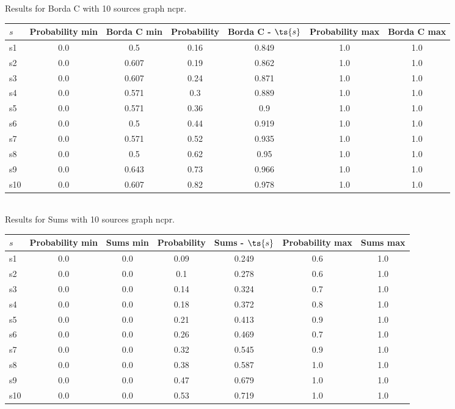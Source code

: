 \documentclass{article}
\begin{document}
\noindent Results for Borda C with 10 sources graph ncpr.

\noindent\begin{tabular}{|l|c|c|c|c|c|c|}
\hline
$s$& Probability min & Borda C min & Probability & Borda C - $\ts{s}$ & Probability max & Borda C max\\
\hline
s1 &0.0 & 0.5 & 0.16 & 0.849 & 1.0 & 1.0\\
\hline
s2 &0.0 & 0.607 & 0.19 & 0.862 & 1.0 & 1.0\\
\hline
s3 &0.0 & 0.607 & 0.24 & 0.871 & 1.0 & 1.0\\
\hline
s4 &0.0 & 0.571 & 0.3 & 0.889 & 1.0 & 1.0\\
\hline
s5 &0.0 & 0.571 & 0.36 & 0.9 & 1.0 & 1.0\\
\hline
s6 &0.0 & 0.5 & 0.44 & 0.919 & 1.0 & 1.0\\
\hline
s7 &0.0 & 0.571 & 0.52 & 0.935 & 1.0 & 1.0\\
\hline
s8 &0.0 & 0.5 & 0.62 & 0.95 & 1.0 & 1.0\\
\hline
s9 &0.0 & 0.643 & 0.73 & 0.966 & 1.0 & 1.0\\
\hline
s10 &0.0 & 0.607 & 0.82 & 0.978 & 1.0 & 1.0\\
\hline
\end{tabular}\\

\noindent Results for Sums with 10 sources graph ncpr.

\noindent\begin{tabular}{|l|c|c|c|c|c|c|}
\hline
$s$& Probability min & Sums min & Probability & Sums - $\ts{s}$ & Probability max & Sums max\\
\hline
s1 &0.0 & 0.0 & 0.09 & 0.249 & 0.6 & 1.0\\
\hline
s2 &0.0 & 0.0 & 0.1 & 0.278 & 0.6 & 1.0\\
\hline
s3 &0.0 & 0.0 & 0.14 & 0.324 & 0.7 & 1.0\\
\hline
s4 &0.0 & 0.0 & 0.18 & 0.372 & 0.8 & 1.0\\
\hline
s5 &0.0 & 0.0 & 0.21 & 0.413 & 0.9 & 1.0\\
\hline
s6 &0.0 & 0.0 & 0.26 & 0.469 & 0.7 & 1.0\\
\hline
s7 &0.0 & 0.0 & 0.32 & 0.545 & 0.9 & 1.0\\
\hline
s8 &0.0 & 0.0 & 0.38 & 0.587 & 1.0 & 1.0\\
\hline
s9 &0.0 & 0.0 & 0.47 & 0.679 & 1.0 & 1.0\\
\hline
s10 &0.0 & 0.0 & 0.53 & 0.719 & 1.0 & 1.0\\
\hline
\end{tabular}\\
\end{document}
